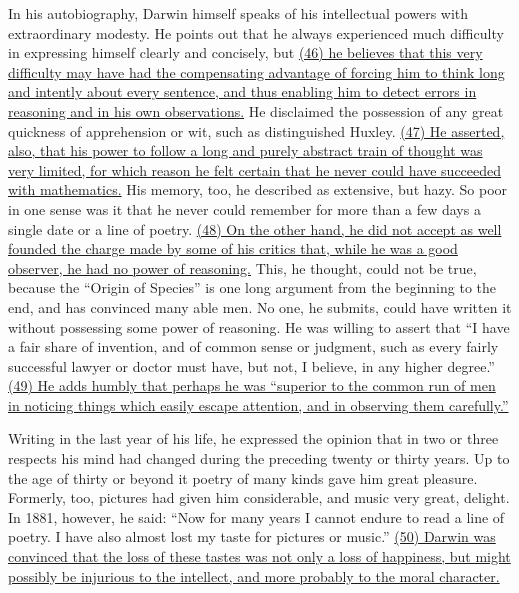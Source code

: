 \qquad In his autobiography, Darwin himself speaks of his intellectual powers with extraordinary modesty. He points out that he always experienced much difficulty in expressing himself clearly and concisely, but \ul{(46) he believes that this very difficulty may have had the compensating advantage of forcing him to think long and intently about every sentence, and thus enabling him to detect errors in reasoning and in his own observations.} He disclaimed the possession of any great quickness of apprehension or wit, such as distinguished Huxley. \ul{(47) He asserted, also, that his power to follow a long and purely abstract train of thought was very limited, for which reason he felt certain that he never could have succeeded with mathematics.} His memory, too, he described as extensive, but hazy. So poor in one sense was it that he never could remember for more than a few days a single date or a line of poetry. \ul{(48) On the other hand, he did not accept as well founded the charge made by some of his critics that, while he was a good observer, he had no power of reasoning.} This, he thought, could not be true, because the “Origin of Species” is one long argument from the beginning to the end, and has convinced many able men. No one, he submits, could have written it without possessing some power of reasoning. He was willing to assert that “I have a fair share of invention, and of common sense or judgment, such as every fairly successful lawyer or doctor must have, but not, I believe, in any higher degree.” \ul{(49) He adds humbly that perhaps he was “superior to the common run of men in noticing things which easily escape attention, and in observing them carefully.”}

\qquad Writing in the last year of his life, he expressed the opinion that in two or three respects his mind had changed during the preceding twenty or thirty years. Up to the age of thirty or beyond it poetry of many kinds gave him great pleasure. Formerly, too, pictures had given him considerable, and music very great, delight. In 1881, however, he said: “Now for many years I cannot endure to read a line of poetry. I have also almost lost my taste for pictures or music.” \ul{(50) Darwin was convinced that the loss of these tastes was not only a loss of happiness, but might possibly be injurious to the intellect, and more probably to the moral character.}